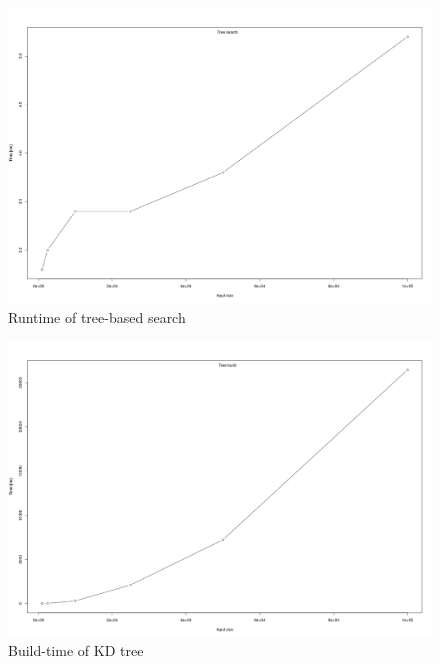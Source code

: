 \documentclass[a4paper]{scrartcl}
\begin{document}
\begin{figure}
	\centering
	\caption{Runtime of tree-based search}
	\includegraphics[width=\linewidth]{resources/search_time_tree.png}
\end{figure}

\begin{figure}
	\centering
	\caption{Build-time of KD tree}
	\includegraphics[width=\linewidth]{resources/build_time_tree.png}
\end{figure}
\end{document}
